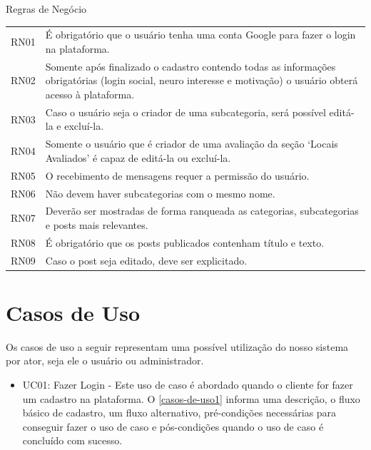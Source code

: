 \begin{quadro}[htb]
	\centering
	\ABNTEXfontereduzida
	\caption[Regras de Negócio]{Regras de Negócio}
	\label{quadro-exemplo}
	\begin{tabular}{|p{3.3cm}|p{10.3cm}|}
		\hline
		\thead{Código} & \thead{Regra de negócio} \\
		\hline
		RN01 & É obrigatório que o usuário tenha uma conta Google para fazer o login na plataforma. \\
		\hline
		RN02 & Somente após finalizado o cadastro contendo todas as informações obrigatórias (login social, neuro interesse e motivação) o usuário obterá acesso à plataforma.\\
		\hline
		RN03 & Caso o usuário seja o criador de uma subcategoria, será possível editá-la e excluí-la.  \\
		\hline
		RN04 & Somente o usuário que é criador de uma avaliação da seção ‘Locais Avaliados’ é capaz de editá-la ou excluí-la. \\
		\hline
		RN05 & O recebimento de mensagens requer a permissão do usuário. \\
		\hline
		RN06 & Não devem haver subcategorias com o mesmo nome. \\
		\hline
		RN07 & Deverão ser mostradas de forma ranqueada as categorias, subcategorias e posts mais relevantes.\\
		\hline
		RN08 & É obrigatório que os posts publicados contenham título e texto.\\
		\hline
		RN09 & Caso o post seja editado, deve ser explicitado.\\
		\hline
	\end{tabular}
\end{quadro}\pagebreak

\section{Casos de Uso}
Os casos de uso a seguir representam uma possível utilização do nosso sistema por ator, seja ele o usuário ou administrador.\\

\begin{itemize}
	\item UC01: Fazer Login - Este uso de caso é abordado quando o cliente for fazer um cadastro na plataforma. O \autoref{casos-de-uso1} informa uma descrição, o fluxo básico de cadastro, um fluxo alternativo, pré-condições necessárias para conseguir fazer o uso de caso e pós-condições quando o uso de caso é concluído com sucesso.\\
	
	
\end{itemize}

